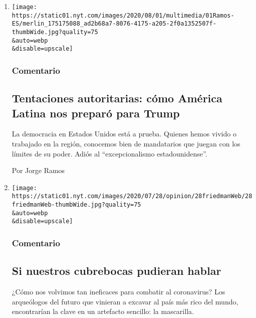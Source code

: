 \begin{enumerate}
\def\labelenumi{\arabic{enumi}.}
\item
  \href{/es/2020/08/01/espanol/opinion/trump-autoritarismo.html}{}

  \texttt{[image: https://static01.nyt.com/images/2020/08/01/multimedia/01Ramos-ES/merlin\_175175088\_ad2b68a7-8076-4175-a205-2f0a1352507f-thumbWide.jpg?quality=75\\\&auto=webp\\\&disable=upscale]}

  \hypertarget{comentario-4}{%
  \subsubsection{Comentario}\label{comentario-4}}

  \hypertarget{tentaciones-autoritarias-cuxf3mo-amuxe9rica-latina-nos-preparuxf3-para-trump}{%
  \subsection{Tentaciones autoritarias: cómo América Latina nos preparó
  para
  Trump}\label{tentaciones-autoritarias-cuxf3mo-amuxe9rica-latina-nos-preparuxf3-para-trump}}

  La democracia en Estados Unidos está a prueba. Quienes hemos vivido o
  trabajado en la región, conocemos bien de mandatarios que juegan con
  los límites de su poder. Adiós al ``excepcionalismo estadounidense''.

  Por Jorge Ramos
\item
  \href{/es/2020/07/30/espanol/opinion/usar-cubrebocas-politica.html}{}

  \texttt{[image: https://static01.nyt.com/images/2020/07/28/opinion/28friedmanWeb/28friedmanWeb-thumbWide.jpg?quality=75\\\&auto=webp\\\&disable=upscale]}

  \hypertarget{comentario-5}{%
  \subsubsection{Comentario}\label{comentario-5}}

  \hypertarget{si-nuestros-cubrebocas-pudieran-hablar}{%
  \subsection{Si nuestros cubrebocas pudieran
  hablar}\label{si-nuestros-cubrebocas-pudieran-hablar}}

  ¿Cómo nos volvimos tan ineficaces para combatir al coronavirus? Los
  arqueólogos del futuro que vinieran a excavar al país más rico del
  mundo, encontrarían la clave en un artefacto sencillo: la mascarilla.


\end{enumerate}
